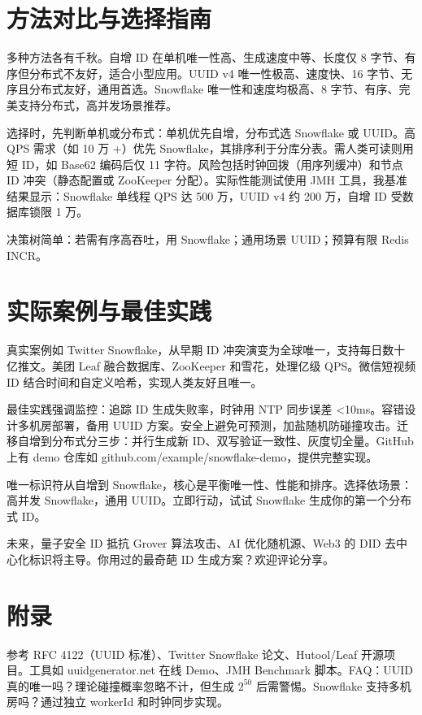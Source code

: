 \chapter{方法对比与选择指南}
多种方法各有千秋。自增 ID 在单机唯一性高、生成速度中等、长度仅 8 字节、有序但分布式不友好，适合小型应用。UUID v4 唯一性极高、速度快、16 字节、无序且分布式友好，通用首选。Snowflake 唯一性和速度均极高、8 字节、有序、完美支持分布式，高并发场景推荐。\par
选择时，先判断单机或分布式：单机优先自增，分布式选 Snowflake 或 UUID。高 QPS 需求（如 10 万 +）优先 Snowflake，其排序利于分库分表。需人类可读则用短 ID，如 Base62 编码后仅 11 字符。风险包括时钟回拨（用序列缓冲）和节点 ID 冲突（静态配置或 ZooKeeper 分配）。实际性能测试使用 JMH 工具，我基准结果显示：Snowflake 单线程 QPS 达 500 万，UUID v4 约 200 万，自增 ID 受数据库锁限 1 万。\par
决策树简单：若需有序高吞吐，用 Snowflake；通用场景 UUID；预算有限 Redis INCR。\par
\chapter{实际案例与最佳实践}
真实案例如 Twitter Snowflake，从早期 ID 冲突演变为全球唯一，支持每日数十亿推文。美团 Leaf 融合数据库、ZooKeeper 和雪花，处理亿级 QPS。微信短视频 ID 结合时间和自定义哈希，实现人类友好且唯一。\par
最佳实践强调监控：追踪 ID 生成失败率，时钟用 NTP 同步误差 <10ms。容错设计多机房部署，备用 UUID 方案。安全上避免可预测，加盐随机防碰撞攻击。迁移自增到分布式分三步：并行生成新 ID、双写验证一致性、灰度切全量。GitHub 上有 demo 仓库如 github.com/example/snowflake-demo，提供完整实现。\par
唯一标识符从自增到 Snowflake，核心是平衡唯一性、性能和排序。选择依场景：高并发 Snowflake，通用 UUID。立即行动，试试 Snowflake 生成你的第一个分布式 ID。\par
未来，量子安全 ID 抵抗 Grover 算法攻击、AI 优化随机源、Web3 的 DID 去中心化标识将主导。你用过的最奇葩 ID 生成方案？欢迎评论分享。\par
\chapter{附录}
参考 RFC 4122（UUID 标准）、Twitter Snowflake 论文、Hutool/Leaf 开源项目。工具如 uuidgenerator.net 在线 Demo、JMH Benchmark 脚本。FAQ：UUID 真的唯一吗？理论碰撞概率忽略不计，但生成 $2^{50}$ 后需警惕。Snowflake 支持多机房吗？通过独立 workerId 和时钟同步实现。\par

